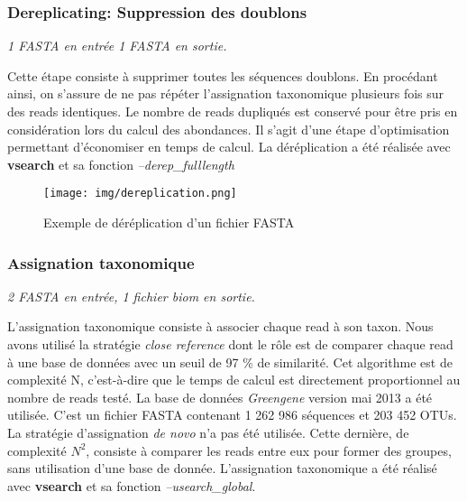 \documentclass[12pt,a4paper]{article}
\begin{document}
\subsubsection{Dereplicating: Suppression des doublons}
\noindent\emph{1 FASTA en entrée 1 FASTA en sortie. }

Cette étape consiste à supprimer toutes les séquences doublons. En procédant ainsi, on s'assure de ne pas répéter l'assignation taxonomique plusieurs fois sur des reads identiques. Le nombre de reads dupliqués est conservé pour être pris en considération lors du calcul des abondances. Il s'agit d'une étape d'optimisation permettant d'économiser en temps de calcul. La déréplication a été réalisée avec \textbf{vsearch}\cite{TorbjornRognes2015} et sa fonction \textit{--derep\_fulllength }

\begin{figure}[ht]
\begin{center}
\texttt{[image: img/dereplication.png]}\hfill
\end{center}
\caption{Exemple de déréplication d'un fichier FASTA}
\label{dereplication}
\end{figure}

\subsubsection{Assignation taxonomique}
\noindent\emph{2 FASTA en entrée,  1 fichier biom  en sortie. }

L’assignation taxonomique consiste à associer chaque read à son taxon. Nous avons utilisé la stratégie \textit{close reference} dont le rôle est de comparer chaque read à une base de données avec un seuil de 97 \% de similarité. Cet algorithme est de complexité N, c'est-à-dire que le temps de calcul est directement proportionnel au nombre de reads testé. La base de données \textit{Greengene}\cite{DeSantis2006} version mai 2013  a été utilisée. C'est un fichier FASTA contenant 1 262 986 séquences et 203 452 OTUs. \\
La stratégie d'assignation \textit{de novo} n'a pas été utilisée. Cette dernière, de complexité $N^{2}$, consiste à comparer les reads entre eux pour former des groupes, sans utilisation d'une base de donnée.
L'assignation taxonomique a été réalisé avec \textbf{vsearch} et sa fonction \textit{--usearch\_global}.
\end{document}
